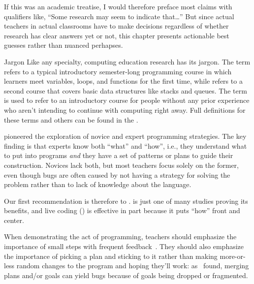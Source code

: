 If this was an academic treatise,
I would therefore preface most claims with qualifiers like,
``Some research may seem to indicate that{\ldots}''
But since actual teachers in actual classrooms have to make decisions
regardless of whether research has clear answers yet or not,
this chapter presents actionable best guesses rather than nuanced perhapses.

\begin{aside}{Jargon}
  Like any specialty,
  computing education research has its jargon.
  The term  refers to a typical introductory semester-long programming course
  in which learners meet variables, loops, and functions for the first time,
  while  refers to a second course
  that covers basic data structures like stacks and queues.
  The term  is used to refer to an introductory course
  for people without any prior experience
  who aren't intending to continue with computing right away.
  Full definitions for these terms and others can be found in
  the .
\end{aside}


\cite{Solo1984,Solo1986} pioneered the exploration of novice and expert programming strategies.
The key finding is that experts know both ``what'' and ``how'',
i.e.,
they understand what to put into programs
\emph{and} they have a set of patterns or plans to guide their construction.
Novices lack both,
but most teachers focus solely on the former,
even though bugs are often caused by not having a strategy for solving the problem
rather than to lack of knowledge about the language.

Our first recommendation is therefore to .
\cite{Mull2007b} is just one of many studies proving its benefits,
and live coding () is effective in part because it puts ``how'' front and center.

When demonstrating the act of programming,
teachers should emphasize the importance of small steps with frequent feedback~\cite{Blik2014}.
They should also emphasize the importance of picking a plan and sticking to it
rather than making more-or-less random changes to the program and hoping they'll work:
as~\cite{Spoh1985} found,
merging plans and/or goals can yield bugs because of goals being dropped or fragmented.


